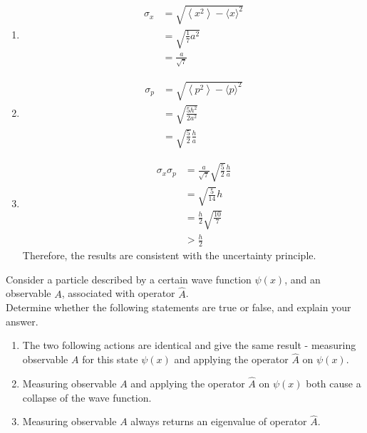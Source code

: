 \documentclass[fleqn, a4paper, 11pt, oneside]{amsart}
\theoremstyle{definition}
\theoremstyle{theorem}
\begin{document}
\begin{solution}
	\begin{enumerate}[leftmargin=*]
		\item
			\begin{align*}
				\sigma_x & = \sqrt{\left\langle x^2 \right\rangle - \langle x \rangle^2} \\
                                         & = \sqrt{\frac{1}{7} a^2}                                      \\
                                         & = \frac{a}{\sqrt{7}}
			\end{align*}
		\item
			\begin{align*}
				\sigma_p & = \sqrt{\left\langle p^2 \right\rangle - \langle p \rangle^2} \\
                                         & = \sqrt{\frac{5 h^2}{2 a^2}}                                  \\
                                         & = \sqrt{\frac{5}{2}} \frac{h}{a}
			\end{align*}
		\item
			\begin{align*}
				\sigma_x \sigma_p & = \frac{a}{\sqrt{7}} \sqrt{\frac{5}{2}} \frac{h}{a} \\
                                                  & = \sqrt{\frac{5}{14}} h                             \\
                                                  & = \frac{h}{2} \sqrt{\frac{10}{7}}                   \\
                                                  & > \frac{h}{2}
			\end{align*}
			Therefore, the results are consistent with the uncertainty principle.
	\end{enumerate}
\end{solution}

\begin{question}
	Consider a particle described by a certain wave function $\psi(x)$, and an observable $A$, associated with operator $\hat{A}$.\\
	Determine whether the following statements are true or false, and explain your answer.
	\begin{enumerate}
		\item The two following actions are identical and give the same result - measuring observable $A$ for this state $\psi(x)$ and applying the operator $\hat{A}$ on $\psi(x)$.
		\item Measuring observable $A$ and applying the operator $\hat{A}$ on $\psi(x)$ both cause a collapse of the wave function.
		\item Measuring observable $A$ always returns an eigenvalue of operator $\hat{A}$.
	\end{enumerate}
\end{question}
\end{document}
